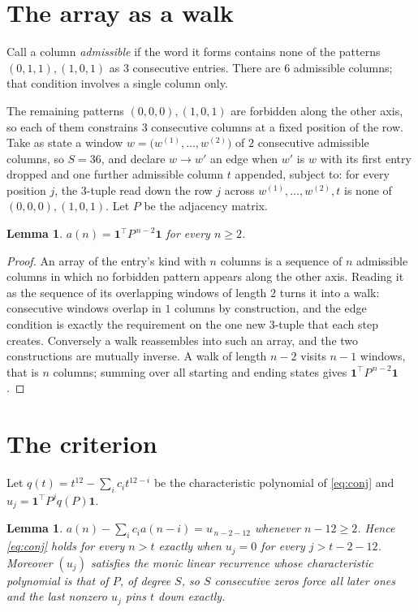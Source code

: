 \documentclass[11pt,a4paper]{article}
\theoremstyle{plain}
\newtheorem{lemma}[theorem]{Lemma}
\theoremstyle{definition}
\begin{document}
\section{The array as a walk}

Call a column \emph{admissible} if the word it forms contains none of the patterns
$(0,1,1), (1,0,1)$ as $3$ consecutive entries. There are $6$ admissible columns; that condition
involves a single column only.

The remaining patterns $(0,0,0), (1,0,1)$ are forbidden along the other axis, so each of them
constrains $3$ consecutive columns at a fixed position of the row. Take as state a
window $w=\bigl(w^{(1)},\dots,w^{(2)}\bigr)$ of $2$ consecutive admissible
columns, so $S=36$, and declare $w\to w'$ an edge when $w'$ is $w$ with its first entry
dropped and one further admissible column $t$ appended, subject to: for every position
$j$, the $3$-tuple read down the row $j$ across $w^{(1)},\dots,w^{(2)},t$
is none of $(0,0,0), (1,0,1)$. Let $P$ be the adjacency matrix.

\begin{lemma}\label{lem:walk}
$a(n)=\mathbf{1}^{\!\top}P^{\,n-2}\mathbf{1}$ for every $n\ge2$.
\end{lemma}

\begin{proof}
An array of the entry's kind with $n$ columns is a sequence of $n$ admissible columns in
which no forbidden pattern appears along the other axis. Reading it as the sequence of its
overlapping windows of length $2$ turns it into a walk: consecutive windows overlap in
$1$ columns by construction, and the edge condition is exactly the requirement on the one
new $3$-tuple that each step creates. Conversely a walk reassembles into such an array,
and the two constructions are mutually inverse. A walk of length $n-2$ visits $n-1$
windows, that is $n$ columns; summing over all starting and ending states gives
$\mathbf{1}^{\!\top}P^{\,n-2}\mathbf{1}$.
\end{proof}

\section{The criterion}

Let $q(t)=t^{12}-\sum_i c_i t^{12-i}$ be the characteristic polynomial of
\eqref{eq:conj} and $u_j=\mathbf{1}^{\!\top}P^{j}q(P)\mathbf{1}$.

\begin{lemma}\label{lem:crit}
$a(n)-\sum_i c_i a(n-i)=u_{\,n-2-12}$ whenever $n-12\ge2$. Hence
\eqref{eq:conj} holds for every $n>t$ exactly when $u_j=0$ for every
$j>t-2-12$. Moreover $(u_j)$ satisfies the monic linear recurrence whose
characteristic polynomial is that of $P$, of degree $S$, so $S$ consecutive zeros force all
later ones and the last nonzero $u_j$ pins $t$ down exactly.
\end{lemma}
\end{document}
